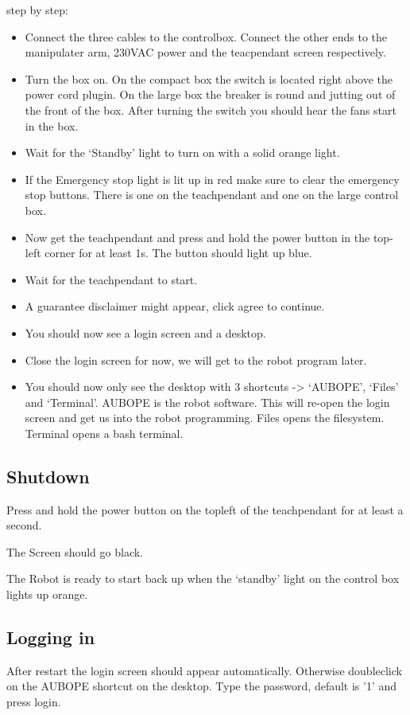 \documentclass{article}
\begin{document}
step by step:
\begin{itemize}
  \item Connect the three cables to the controlbox. Connect the other ends to the manipulater arm, 230VAC power and the teacpendant screen respectively.
  \item Turn the box on. On the compact box the switch is located right above the power cord plugin. On the large box the breaker is round and jutting out of the front of the box. After turning the switch you should hear the fans start in the box.
\item Wait for the ‘Standby’ light to turn on with a solid orange light. 
\item If the Emergency stop light is lit up in red make sure to clear the emergency stop buttons. There is one on the teachpendant and one on the large control box. 
\item Now get the teachpendant and press and hold the power button in the top-left corner for at least 1s. The button should light up blue.
\item Wait for the teachpendant to start. 
\item A guarantee disclaimer might appear, click agree to continue. 
\item You should now see a login screen and a desktop. 
\item Close the login screen for now, we will get to the robot program later. 
\item You should now only see the desktop with 3 shortcuts -> ‘AUBOPE’, ‘Files’ and ‘Terminal’. AUBOPE is the robot software. This will re-open the login screen and get us into the robot programming. Files opens the filesystem. Terminal opens a bash terminal.
\end{itemize}

\subsection{Shutdown} 
Press and hold the power button on the topleft of the teachpendant for at least a second.

The Screen should go black. 

The Robot is ready to start back up when the ‘standby’ light on the control box lights up orange. 

\subsection{Logging in}
\label{subsec:login}
After restart the login screen should appear automatically. Otherwise doubleclick on the AUBOPE shortcut on the desktop. Type the password, default is '1' and press login. 
\end{document}
